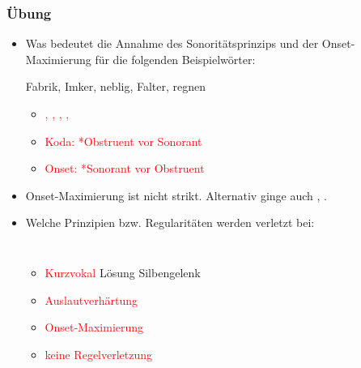 {
%

\begin{frame}
\frametitle{Übung}

\begin{itemize}
	\item Was bedeutet die Annahme des Sonoritätsprinzips und der Onset-Maximierung für die folgenden Beispielwörter:
	

	\ea Fabrik, Imker, neblig, Falter, regnen
	\z

\pause

	\begin{itemize}
	\item[] \textcolor{red}{\textipa{[fa:.b\textscr Ik]}, \pause
		\textipa{[PIm.k5]}, \pause
		\textipa{[ne:.blI\c{c}]}, \pause
		\textipa{[fal.t5]}, \pause
		\textipa{[\textscr e:.gn@n]}} \pause
	\item [] \textcolor{red}{Koda: *Obstruent vor Sonorant} 
	\item [] \textcolor{red}{Onset: *Sonorant vor Obstruent}
	\end{itemize}
	\pause
	\item Onset-Maximierung ist nicht strikt. Alternativ ginge auch \textipa{[ne:p.lI\c{c}]}, \textipa{[\textscr e:k.n@n]}.
	

	\item Welche Prinzipien bzw. Regularitäten werden verletzt bei:

\begin{columns}
	\eal
		\ex \textipa{[PE.b@]}
		\ex \textipa{[PEb.@]}
		\ex \textipa{[PEp.@]}
		\ex \textipa{[PEp.b@]}
	\zl

\pause

\begin{itemize}
	\item[] \textcolor{red}{\ras Kurzvokal} Lösung \zb Silbengelenk \textipa{[PE\.b@]}
	\item[] \textcolor{red}{\ras Auslautverhärtung}
	\item[] \textcolor{red}{\ras Onset-Maximierung}
	\item[] \textcolor{red}{\ras keine Regelverletzung}
\end{itemize}
	

\end{columns}
\end{itemize}
\end{frame}}
